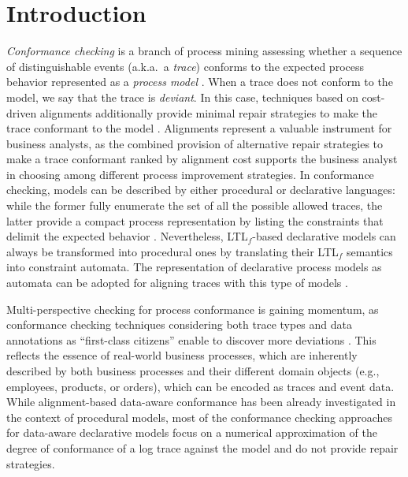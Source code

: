 \section{Introduction}
\textit{Conformance checking} is a branch of process mining  assessing whether a sequence of distinguishable events (a.k.a.\ a \textit{trace}) conforms to the expected process behavior represented as a \textit{process model} \cite{RozinatA08}. When a trace does not conform to the model, we say that the trace is \textit{deviant}. In this case, techniques based on cost-driven alignments additionally provide minimal repair strategies to make the trace conformant to the model \cite{LeoniA13}. Alignments represent a valuable instrument for business analysts, as the combined provision of alternative repair strategies to make a trace conformant ranked by alignment cost supports the business analyst in choosing among different process improvement strategies. In conformance checking, models can be described by either procedural or declarative languages: while the former fully enumerate the set of all the possible allowed traces, the latter provide a compact process representation by listing the constraints that delimit the expected behavior \cite{LeoniA13,Westergaard11}. Nevertheless, LTL$_f$-based declarative models can always be transformed into procedural ones by translating their LTL$_f$ semantics into constraint automata.
The representation of declarative process models as automata can be adopted for aligning traces with this type of models \cite{LeoniMA12,XuLZ17a}.


Multi-perspective checking for process conformance is gaining momentum, as conformance checking techniques considering both trace types and data annotations as ``first-class citizens'' enable to discover more deviations \cite{MultiPerspective}. This reflects the essence of real-world business processes, which are inherently described by both business processes and their different domain objects \cite{PetermannJMR14} (e.g., employees, products, or orders), which can be encoded as traces and event data. While alignment-based  data-aware conformance has been already investigated in the context of procedural models, most of the conformance checking approaches for data-aware declarative models \cite{BurattinMS16,Borrego014} focus on a numerical approximation of the degree of conformance of a log trace against the model and do not provide repair strategies.


